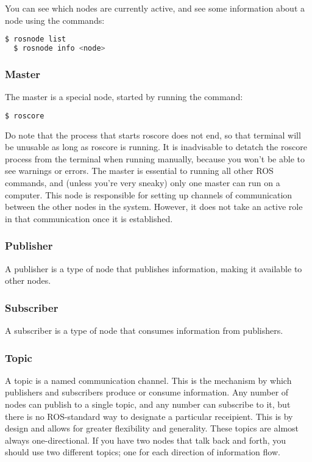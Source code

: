 You can see which nodes are currently active, and see some information about a node using the commands:

\begin{lstlisting}[language=bash]
  $ rosnode list
  $ rosnode info <node>
\end{lstlisting}

\subsubsection{Master}

The master is a special node, started by running the command:

\begin{lstlisting}[language=bash]
  $ roscore
\end{lstlisting}

Do note that the process that starts roscore does not end, so that terminal will be unusable as long as roscore is running. It is inadvisable to detatch the roscore process from the terminal when running manually, because you won't be able to see warnings or errors. The master is essential to running all other ROS commands, and (unless you're very sneaky) only one master can run on a computer. This node is responsible for setting up channels of communication between the other nodes in the system. However, it does not take an active role in that communication once it is established.

\subsubsection{Publisher}

A publisher is a type of node that publishes information, making it available to other nodes.

\subsubsection{Subscriber}

A subscriber is a type of node that consumes information from publishers.

\subsubsection{Topic}

A topic is a named communication channel. This is the mechanism by which publishers and subscribers produce or consume information. Any number of nodes can publish to a single topic, and any number can subscribe to it, but there is no ROS-standard way to designate a particular receipient. This is by design and allows for greater flexibility and generality. These topics are almost always one-directional. If you have two nodes that talk back and forth, you should use two different topics; one for each direction of information flow.

